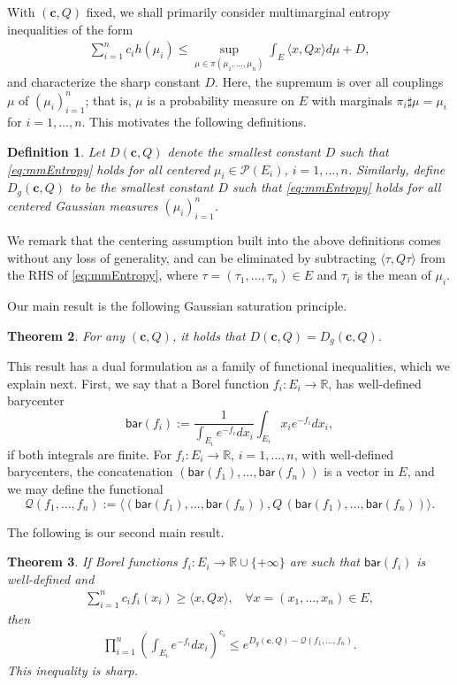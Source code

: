 \documentclass[10pt]{article}
\newtheorem{theorem}{Theorem}
\newtheorem{definition}[theorem]{Definition}
\newcommand{\bary}{\mathsf{bar}}
\begin{document}
With  $(\mathbf{c},Q)$ fixed,  we shall primarily consider   multimarginal entropy inequalities of the form  
\begin{align}
 \sum_{i=1}^n c_i h(\mu_i)   \leq  \sup_{\mu \in \pi(\mu_1, \dots, \mu_n) } \int_E \langle x, Q x\rangle d\mu  + D, \label{eq:mmEntropy}
\end{align} 
and characterize the sharp constant $D$.  Here, the supremum is over all couplings $\mu$ of $(\mu_i)_{i=1}^n$; that is, $\mu$ is a probability measure on $E$ with marginals $\pi_i \sharp \mu = \mu_i$ for $i=1,\dots,n$.   This motivates the following definitions.
\begin{definition}
Let $D(\mathbf{c},Q)$ denote the smallest constant $D$ such that \eqref{eq:mmEntropy} holds for all centered $\mu_i \in \mathcal{P}(E_i)$, $i=1,\dots, n$.   Similarly, define $D_g(\mathbf{c},Q)$ to be the smallest constant $D$ such that \eqref{eq:mmEntropy} holds for all centered Gaussian measures $(\mu_i)_{i=1}^n$.  
 \end{definition}
We remark that the centering assumption built into the above definitions comes without any loss of generality, and can be eliminated by subtracting $\langle \tau, Q \tau\rangle$ from the RHS of \eqref{eq:mmEntropy}, where $\tau = (\tau_1, \dots, \tau_n) \in E$ and $\tau_i$ is the mean of $\mu_i$.   
 
 Our main result is the following Gaussian saturation principle.
 \begin{theorem}\label{thm:GaussianSaturation}
 For any $(\mathbf{c},Q)$, it holds that $D(\mathbf{c},Q)=D_g(\mathbf{c},Q)$.
 \end{theorem}
 
 
 This result has a dual formulation as a family of functional inequalities, which we explain next.  First, we say that  a Borel function $f_i : E_i \to \mathbb{R}$, has well-defined  barycenter
$$
\bary(f_i) := \frac{1}{\int_{E_i} e^{-f_i} dx_i}\int_{E_i} x_i e^{-f_i} dx_i, 
$$
if both integrals are finite.  For   $f_i : E_i \to \mathbb{R}$, $i=1, \dots, n$, with well-defined barycenters, the concatenation   $(\bary(f_1), \dots, \bary(f_n))$ is a vector in $E$, and we may define the functional 
$$
\mathcal{Q}(f_1, \dots, f_n) := \big\langle (\bary(f_1), \dots, \bary(f_n)), Q\,  (\bary(f_1), \dots, \bary(f_n))\big\rangle.  
$$

The following is our second main result.
\begin{theorem}\label{thm:dualityAsymm}
If   Borel functions $f_i: E_i \to \mathbb{R} \cup\{+\infty\}$   are such that $\bary(f_i)$ is well-defined and 
\begin{align}
\sum_{i=1}^n c_i f_i(x_i) \geq  \langle x, Q x\rangle, ~~~~ \forall x=(x_1, \dots, x_n) \in E, \label{eq:pointwiseInequalityIntro}
\end{align}
then 
\begin{align}
 \prod_{i=1}^n \left( \int_{E_i}e^{-f_i} d x_i\right)^{c_i} \leq e^{D_g(\mathbf{c},Q)-\mathcal{Q}(f_1, \dots, f_n)}.  \label{IntegralIneqIntro}
\end{align}
This inequality is sharp.  
\end{theorem}
\end{document}
